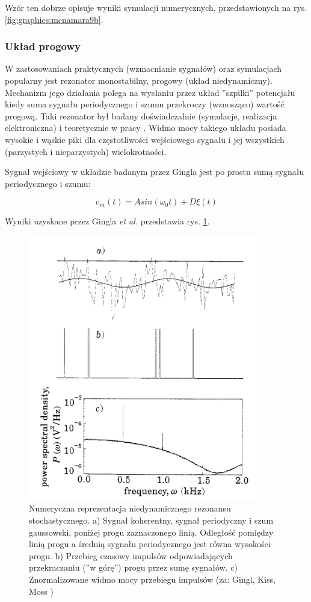   Wzór ten dobrze opisuje wyniki symulacji numerycznych, przedstawionych na rys. \ref{fig:graphics:mcnamara9b}.



  \subsubsection{Układ progowy}
  \label{sec:uklad_progowy}

  W zastosowaniach praktycznych (wzmacnianie sygnałów) oraz symulacjach popularny jest rezonator monostabilny, progowy (układ niedynamiczny). Mechanizm jego działania polega na wysłaniu przez układ ''szpilki'' potencjału kiedy suma sygnału periodycznego i szumu przekroczy (wznosząco) wartość progową. Taki rezonator był badany doświadczalnie (symulacje, realizacja elektroniczna) i teoretycznie w pracy \cite{gingl_kiss_moss}. Widmo mocy takiego układu posiada wysokie i wąskie piki dla częstotliwości wejściowego sygnału i jej wszystkich (parzystych i nieparzystych) wielokrotności.

  Sygnał wejściowy w układzie badanym przez Gingla \cite{gingl_kiss_moss} jest po prostu sumą sygnału periodycznego i szumu:

  \begin{equation} \label{sr:gingl}
    v_{in}(t) = A sin (\omega_0 t) + D \xi(t)
  \end{equation}
  
  Wyniki uzyskane przez Gingla \emph{et al.} przedstawia rys. \ref{fig:graphics:gingl}. 

  \begin{figure}
    \includegraphics[width=100mm]{images/gingl_1.png}
    \caption{Numeryczna reprezentacja niedynamicznego rezonansu stochastycznego. a) Sygnał koherentny, sygnał periodyczny i szum gaussowski, poniżej progu zaznaczonego linią. Odległość pomiędzy linią progu a średnią sygnału periodycznego jest równa wysokości progu. b) Przebieg czasowy impulsów odpowiadających przekraczaniu (''w górę'') progu przez sumę sygnałów. c) Znormalizowane widmo mocy przebiegu impulsów (za: Gingl, Kiss, Moss \cite{gingl_kiss_moss} )}
    \label{fig:graphics:gingl}
  \end{figure}

